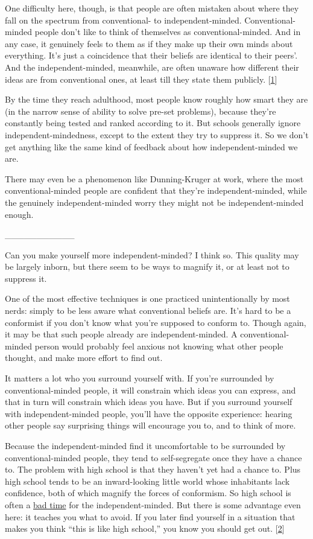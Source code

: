 One difficulty here, though, is that people are often mistaken about
where they fall on the spectrum from conventional- to
independent-minded. Conventional-minded people don't like to think of
themselves as conventional-minded. And in any case, it genuinely feels
to them as if they make up their own minds about everything. It's just a
coincidence that their beliefs are identical to their peers'. And the
independent-minded, meanwhile, are often unaware how different their
ideas are from conventional ones, at least till they state them
publicly. {[}\hyperref[f1n]{1}{]}

By the time they reach adulthood, most people know roughly how smart
they are (in the narrow sense of ability to solve pre-set problems),
because they're constantly being tested and ranked according to it. But
schools generally ignore independent-mindedness, except to the extent
they try to suppress it. So we don't get anything like the same kind of
feedback about how independent-minded we are.

There may even be a phenomenon like Dunning-Kruger at work, where the
most conventional-minded people are confident that they're
independent-minded, while the genuinely independent-minded worry they
might not be independent-minded enough.

\_\_\_\_\_\_\_\_\_\_\_

Can you make yourself more independent-minded? I think so. This quality
may be largely inborn, but there seem to be ways to magnify it, or at
least not to suppress it.

One of the most effective techniques is one practiced unintentionally by
most nerds: simply to be less aware what conventional beliefs are. It's
hard to be a conformist if you don't know what you're supposed to
conform to. Though again, it may be that such people already are
independent-minded. A conventional-minded person would probably feel
anxious not knowing what other people thought, and make more effort to
find out.

It matters a lot who you surround yourself with. If you're surrounded by
conventional-minded people, it will constrain which ideas you can
express, and that in turn will constrain which ideas you have. But if
you surround yourself with independent-minded people, you'll have the
opposite experience: hearing other people say surprising things will
encourage you to, and to think of more.

Because the independent-minded find it uncomfortable to be surrounded by
conventional-minded people, they tend to self-segregate once they have a
chance to. The problem with high school is that they haven't yet had a
chance to. Plus high school tends to be an inward-looking little world
whose inhabitants lack confidence, both of which magnify the forces of
conformism. So high school is often a \href{nerds.html}{bad time} for
the independent-minded. But there is some advantage even here: it
teaches you what to avoid. If you later find yourself in a situation
that makes you think ``this is like high school,'' you know you should
get out. {[}\hyperref[f2n]{2}{]}

